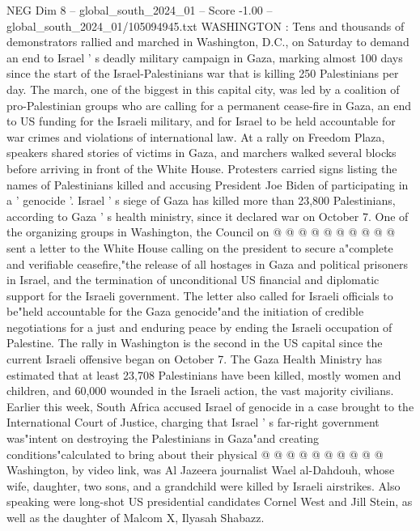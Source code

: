 \begin{textsample}{NEG Dim 8 – global\_south\_2024\_01 – Score -1.00 – global\_south\_2024\_01/105094945.txt}  \label{ex:f8_neg_057}
WASHINGTON : Tens and thousands of demonstrators rallied and marched in Washington, D.C., on Saturday to demand an end to Israel ' s deadly military campaign in Gaza, marking almost 100 days since the start of the Israel-Palestinians war that is killing 250 Palestinians per day.
The march, one of the biggest in this capital city, was led by a coalition of pro-Palestinian groups who are calling for a permanent cease-fire in Gaza, an end to US funding for the Israeli military, and for Israel to be held accountable for war crimes and violations of international law.
At a rally on Freedom Plaza, speakers shared stories of victims in Gaza, and marchers walked several blocks before arriving in front of the White House.
Protesters carried signs listing the names of Palestinians killed and accusing President Joe Biden of participating in a ' genocide '.
Israel ' s siege of Gaza has killed more than 23,800 Palestinians, according to Gaza ' s health ministry, since it declared war on October 7.
One of the organizing groups in Washington, the Council on @ @ @ @ @ @ @ @ @ @ sent a letter to the White House calling on the president to secure a"complete and verifiable ceasefire,"the release of all hostages in Gaza and political prisoners in Israel, and the termination of unconditional US financial and diplomatic support for the Israeli government.
The letter also called for Israeli officials to be"held accountable for the Gaza genocide"and the initiation of credible negotiations for a just and enduring peace by ending the Israeli occupation of Palestine.
The rally in Washington is the second in the US capital since the current Israeli offensive began on October 7.
The Gaza Health Ministry has estimated that at least 23,708 Palestinians have been killed, mostly women and children, and 60,000 wounded in the Israeli action, the vast majority civilians.
Earlier this week, South Africa accused Israel of genocide in a case brought to the International Court of Justice, charging that Israel ' s far-right government was"intent on destroying the Palestinians in Gaza"and creating conditions"calculated to bring about their physical @ @ @ @ @ @ @ @ @ @ Washington, by video link, was Al Jazeera journalist Wael al-Dahdouh, whose wife, daughter, two sons, and a grandchild were killed by Israeli airstrikes.
Also speaking were long-shot US presidential candidates Cornel West and Jill Stein, as well as the daughter of Malcom X, Ilyasah Shabazz.

\end{textsample}
